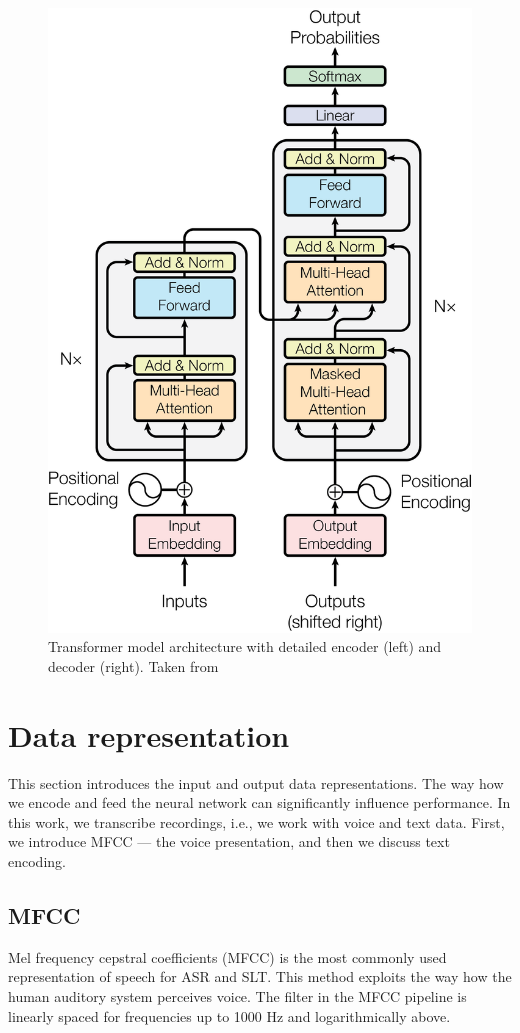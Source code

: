 \begin{figure}[]
	\centering
	\includegraphics[width=0.8\linewidth]{img/ModalNet-21.png}
	\caption{Transformer model architecture with detailed encoder (left) and decoder (right). Taken from }
	\label{fig:transformer}
\end{figure}





\pagebreak
\section{Data representation}
This section introduces the input and output data representations. The way how we encode and feed the neural network can significantly influence performance. In this work, we transcribe recordings, i.e., we work with voice and text data. First, we introduce MFCC --- the voice presentation, and then we discuss text encoding.

\subsection{MFCC}
\label{mfcc}
Mel frequency cepstral coefficients (MFCC) is the most commonly used representation of speech for ASR and SLT. 
This method exploits the way how the human auditory system perceives voice. The filter in the MFCC pipeline is linearly spaced for frequencies up to 1000 Hz and logarithmically above. 

